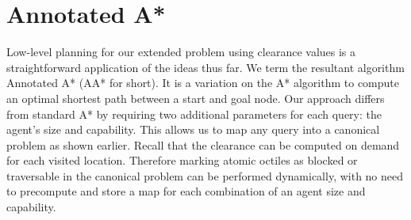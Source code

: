 \section{Annotated A*}
\label{aha:aastar}
Low-level planning for our extended problem using clearance values is a straightforward application of the ideas thus far.
We term the resultant algorithm Annotated A* (AA* for short).
It is a variation on the A* algorithm \cite{astar} to compute an optimal shortest path between a start and goal node.  
Our approach differs from standard A* by requiring two additional parameters for each query: the agent's size and capability. This allows us to map any query into a canonical problem as shown earlier.
Recall that the clearance can be computed on demand for each visited location.
Therefore marking atomic octiles as blocked or traversable in the canonical problem can be performed
dynamically, with no need to precompute and store a map for each combination of an agent size and capability.

